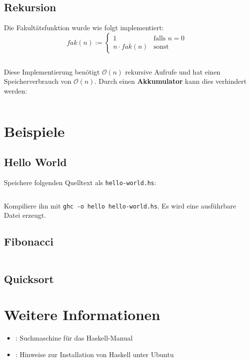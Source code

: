 \inputminted[numbersep=5pt, tabsize=4]{haskell}{scripts/haskell/binomialkoeffizient.hs}
\inputminted[numbersep=5pt, tabsize=4]{bash}{scripts/haskell/compile-binom.sh}


\subsection{Rekursion}
Die Fakultätsfunktion wurde wie folgt implementiert:
\[fak(n) := \begin{cases}
        1              &\text{falls } n=0\\
        n \cdot fak(n) &\text{sonst}
    \end{cases}\]
\inputminted[numbersep=5pt, tabsize=4]{haskell}{scripts/haskell/fakultaet.hs}

Diese Implementierung benötigt $\mathcal{O}(n)$ rekursive Aufrufe und
hat einen Speicherverbrauch von $\mathcal{O}(n)$. Durch einen
\textbf{Akkumulator} kann dies verhindert werden:
\inputminted[numbersep=5pt, tabsize=4]{haskell}{scripts/haskell/fakultaet-akkumulator.hs}

\section{Beispiele}
\subsection{Hello World}
Speichere folgenden Quelltext als \texttt{hello-world.hs}:
\inputminted[linenos, numbersep=5pt, tabsize=4, frame=lines, label=hello-world.hs]{haskell}{scripts/haskell/hello-world.hs}

Kompiliere ihn mit \texttt{ghc -o hello hello-world.hs}. Es wird eine
ausführbare Datei erzeugt.

\subsection{Fibonacci}
\inputminted[linenos, numbersep=5pt, tabsize=4, frame=lines, label=fibonacci.hs]{haskell}{scripts/haskell/fibonacci.hs}

\subsection{Quicksort}

\section{Weitere Informationen}
\begin{itemize}
    \item \href{http://www.haskell.org/hoogle/}{}: Suchmaschine für das Haskell-Manual
    \item \href{http://wiki.ubuntuusers.de/Haskell}{}: Hinweise zur Installation von Haskell unter Ubuntu
\end{itemize}


